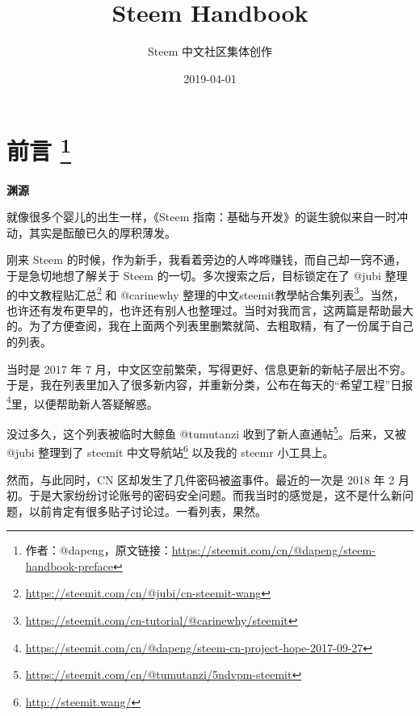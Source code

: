 \documentclass[]{ctexbook}
\title{Steem Handbook}
\author{Steem 中文社区集体创作}
\date{2019-04-01}
\renewcommand{\href}[2]{#2\footnote{\url{#1}}}
\begin{document}

\begin{titlepage}

\end{titlepage}

\setlength{\abovedisplayskip}{-5pt}
\setlength{\abovedisplayshortskip}{-5pt}

{
\setcounter{tocdepth}{1}
\tableofcontents
}


\hypertarget{index}{%
\chapter*{\texorpdfstring{前言 \footnote{作者：@dapeng，原文链接：\url{https://steemit.com/cn/@dapeng/steem-handbook-preface}}}{前言 }}\label{index}}

\textbf{渊源}

就像很多个婴儿的出生一样，《Steem 指南：基础与开发》的诞生貌似来自一时冲动，其实是酝酿已久的厚积薄发。

刚来 Steem 的时候，作为新手，我看着旁边的人哗哗赚钱，而自己却一窍不通，于是急切地想了解关于 Steem 的一切。多次搜索之后，目标锁定在了 @jubi 整理的\href{https://steemit.com/cn/@jubi/cn-steemit-wang}{中文教程贴汇总} 和 @carinewhy 整理的\href{https://steemit.com/cn-tutorial/@carinewhy/steemit}{中文steemit教學帖合集列表}。当然，也许还有发布更早的，也许还有别人也整理过。当时对我而言，这两篇是帮助最大的。为了方便查阅，我在上面两个列表里删繁就简、去粗取精，有了一份属于自己的列表。

当时是 2017 年 7 月，中文区空前繁荣，写得更好、信息更新的新帖子层出不穷。于是，我在列表里加入了很多新内容，并重新分类，公布在每天的\href{https://steemit.com/cn/@dapeng/steem-cn-project-hope-2017-09-27}{``希望工程''日报}里，以便帮助新人答疑解惑。

没过多久，这个列表被临时大鲸鱼 @tumutanzi 收到了\href{https://steemit.com/cn/@tumutanzi/5ndvpm-steemit}{新人直通帖}。后来，又被 @jubi 整理到了 \href{http://steemit.wang/}{steemit 中文导航站} 以及我的 steemr 小工具上。

然而，与此同时，CN 区却发生了几件密码被盗事件。最近的一次是 2018 年 2 月初。于是大家纷纷讨论账号的密码安全问题。而我当时的感觉是，这不是什么新问题，以前肯定有很多贴子讨论过。一看列表，果然。
\end{document}
